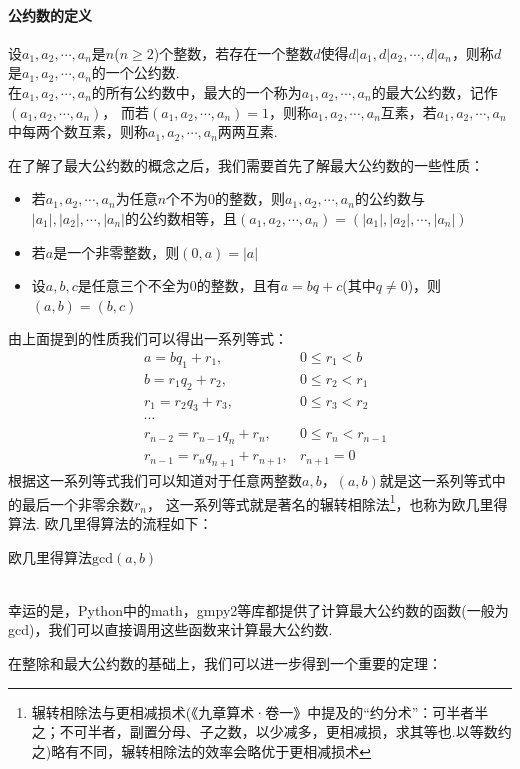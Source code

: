 \documentclass{article}
\numberwithin{equation}{subsubsection}
\begin{document}
\paragraph{\textbf{公约数的定义}}
设$a_1, a_2,\cdots,a_n$是$n$($n\ge2$)个整数，若存在一个整数$d$使得$d|a_1,d|a_2,\cdots,d|a_n$，则称$d$是$a_1,a_2,\cdots,a_n$的一个公约数.\\
在$a_1, a_2,\cdots,a_n$的所有公约数中，最大的一个称为$a_1, a_2,\cdots,a_n$的最大公约数，记作$(a_1,a_2,\cdots,a_n)$，
而若$(a_1,a_2,\cdots,a_n)=1$，则称$a_1, a_2,\cdots,a_n$互素，若$a_1, a_2,\cdots,a_n$中每两个数互素，则称$a_1, a_2,\cdots,a_n$两两互素.\par
在了解了最大公约数的概念之后，我们需要首先了解最大公约数的一些性质：
\begin{itemize}
    \item 若$a_1,a_2,\cdots,a_n$为任意$n$个不为$0$的整数，则$a_1,a_2,\cdots,a_n$的公约数与$|a_1|,|a_2|,\cdots,|a_n|$的公约数相等，且$(a_1,a_2,\cdots,a_n)=(|a_1|,|a_2|,\cdots,|a_n|)$
    \item 若$a$是一个非零整数，则$(0,a)=|a|$
    \item 设$a,b,c$是任意三个不全为$0$的整数，且有$a=bq+c$(其中$q\neq0$)，则$(a,b)=(b,c)$
\end{itemize}
由上面提到的性质我们可以得出一系列等式：
\begin{equation}
\begin{aligned}
    &a=bq_1+r_1,&0\leq r_1 < b\\
    &b=r_1q_2+r_2,&0\leq r_2 < r_1\\
    &r_1=r_2q_3+r_3,&0\leq r_3 < r_2\\
    &\cdots\\
    &r_{n-2}=r_{n-1}q_n+r_n,&0\leq r_n < r_{n-1}\\
    &r_{n-1}=r_nq_{n+1}+r_{n+1},&r_{n+1}=0
\end{aligned}
\end{equation}
根据这一系列等式我们可以知道对于任意两整数$a,b$，$(a,b)$就是这一系列等式中的最后一个非零余数$r_n$，
这一系列等式就是著名的辗转相除法\footnote{辗转相除法与更相减损术(《九章算术·卷一》中提及的“约分术”：可半者半之；不可半者，副置分母、子之数，以少减多，更相减损，求其等也.以等数约之)略有不同，辗转相除法的效率会略优于更相减损术}，也称为欧几里得算法.
欧几里得算法的流程如下：
\begin{algorithm}
    \caption{欧几里得算法$\text{gcd}(a,b)$}
\end{algorithm}\\
幸运的是，Python中的math，gmpy2等库都提供了计算最大公约数的函数(一般为gcd)，我们可以直接调用这些函数来计算最大公约数.\par
在整除和最大公约数的基础上，我们可以进一步得到一个重要的定理：
\end{document}
